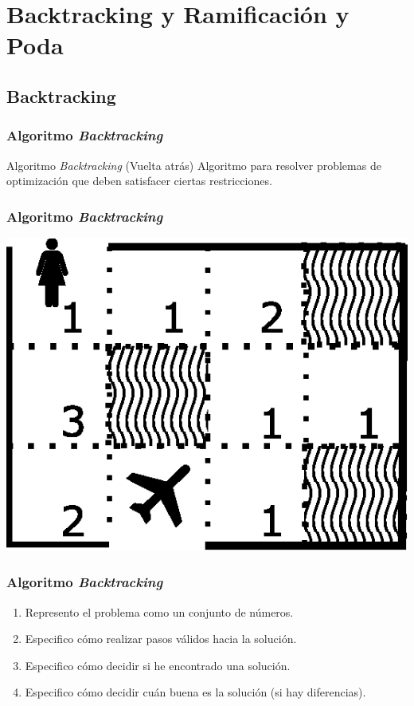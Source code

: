 \documentclass[a4paper,t,xcolor=pst,dvips,colortheme]{beamer}
\begin{document}
\section{Backtracking y Ramificación y Poda}

\subsection{Backtracking}

\begin{frame}[c]
    \frametitle{Algoritmo \emph{Backtracking}}
    \begin{block}{Algoritmo \emph{Backtracking} (Vuelta atrás)}
        Algoritmo para resolver problemas de optimización que deben satisfacer ciertas restricciones.
    \end{block}
\end{frame}

\begin{frame}[c]
    \frametitle{Algoritmo \emph{Backtracking}}
    \begin{center}
        \includegraphics[width=0.5\linewidth]{images/backtracking/laberinto.eps}
    \end{center}
\end{frame}

\begin{frame}[c]
    \frametitle{Algoritmo \emph{Backtracking}}
    \begin{enumerate}[<+->]
        \item Represento el problema como un conjunto de números.
        \item Especifico cómo realizar pasos válidos hacia la solución.
        \item Especifico cómo decidir si he encontrado una solución.
        \item Especifico cómo decidir cuán buena es la solución (si hay diferencias).
    \end{enumerate}
\end{frame}
\end{document}
